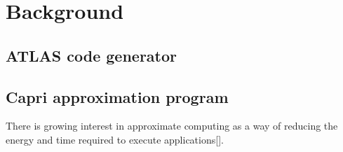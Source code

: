 \section{Background}
\label{sec:background}

  \subsection{ATLAS code generator}
  \label{sec:atlas_intro}

  \subsection{Capri approximation program}
  \label{sec:Capri_intro}
  There is growing interest in approximate computing as a way of reducing the
  energy and time required to execute applications[].
